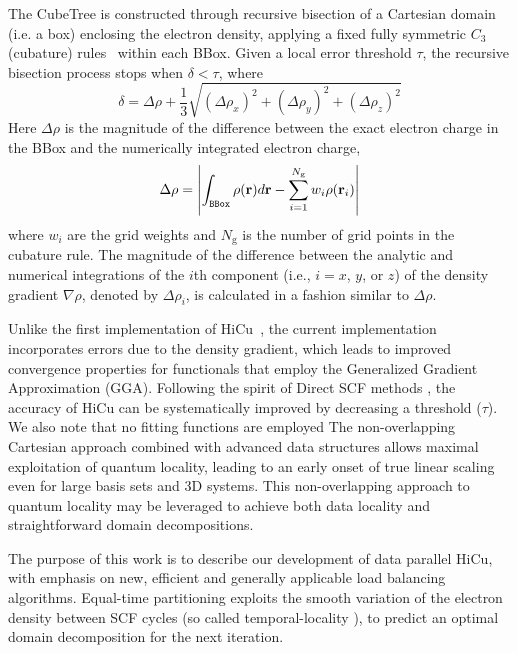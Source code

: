\commentoutA{\documentclass[prb,aps,twocolumn,twocolumngrid]{revtex4}}
\begin{document}
The CubeTree is constructed through recursive bisection of a Cartesian
domain (i.e. a box) enclosing the electron density, applying a fixed
fully symmetric $C_3$ (cubature) rules~\cite{Stroud71} within each
BBox.  Given a local error threshold $\tau$, the
recursive bisection process stops when $\delta < \tau$, where
\begin{equation}
\delta = \Delta \rho+ \frac{1}{3} \sqrt{(\Delta \rho_x)^2 + (\Delta
\rho_y)^2 + (\Delta \rho_z)^2}
\label{eq:delta}
\end{equation}
Here $\Delta \rho$ is the magnitude of the difference between the
exact electron charge in the BBox and the numerically integrated
electron charge,
\begin{equation}
\Delta \rho = \left|\int_{\tt{BBox}}\rho({\bf r}) d{\bf r} -
\sum_{i=1}^{N_{\mathrm{g}}} w_i\rho({\bf r}_i)\right|
\end{equation}
where $w_i$ are the grid weights and $N_{\mathrm{g}}$ is the number of
grid points in the cubature rule. The magnitude of the difference
between the analytic and numerical integrations of the $i$th component
(i.e., $i = x$, $y$, or $z$) of the density gradient $\nabla \rho$,
denoted by $\Delta \rho_i $, is calculated in a fashion similar to $\Delta \rho$. 

Unlike the first implementation of
HiCu~\cite{MChallacombe00A}, the current implementation 
incorporates errors due to the density gradient, which leads
to improved convergence properties for functionals that employ the 
Generalized Gradient Approximation (GGA).  Following the spirit
of Direct SCF methods \cite{JAlmlof82,MHaser89}, the accuracy of HiCu 
can be systematically improved by decreasing a threshold ($\tau$).  We also note
that no fitting functions are employed
The non-overlapping Cartesian approach combined with advanced data structures
allows maximal exploitation of quantum locality, leading to an early onset of true 
linear scaling even for large basis sets and 3D systems.  This non-overlapping 
approach to quantum locality may  be leveraged to achieve both data locality
and straightforward domain decompositions.

The purpose of this work is to describe our development of data parallel HiCu,
with emphasis on new, efficient and generally applicable load balancing algorithms.
Equal-time partitioning exploits the smooth variation of the electron density 
between SCF cycles (so called temporal-locality \cite{JPilkington96}), 
to predict an optimal domain decomposition for the next iteration. 
\end{document}
